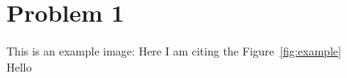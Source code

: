 \section*{Problem 1}
This is an example image:
Here I am citing the Figure~\ref{fig:example} \\
Hello